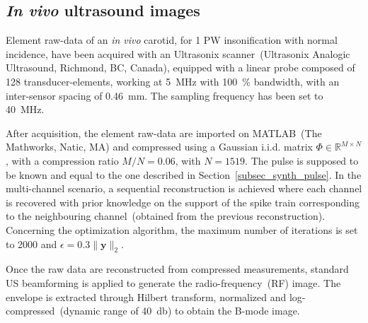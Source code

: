 \documentclass{article}
\newcommand{\vect}[1]{\bm{#1}}
\newcommand{\mat}[1]{\mathsf{#1}}
\theoremstyle{definition}
\begin{document}
\subsection{\textit{In vivo} ultrasound images}
\label{subsec_invivo_images}
Element raw-data of an \textit{in vivo} carotid, for 1 PW insonification with normal incidence, have been acquired with an Ultrasonix scanner~(Ultrasonix Analogic Ultrasound, Richmond, BC, Canada), equipped with a linear probe composed of \num{128} transducer-elements, working at \SI{5}{\mega\hertz} with \SI{100}{\percent} bandwidth, with an inter-sensor spacing of \SI{0.46}{\milli\metre}. The sampling frequency has been set to \SI{40}{\mega\hertz}. 

After acquisition, the element raw-data are imported on MATLAB~(The Mathworks, Natic, MA) and compressed using a Gaussian i.i.d. matrix $\mat{\Phi} \in \mathbb{R}^{M \times N}$, with a compression ratio $M/N = 0.06$, with $N=1519$. The pulse is supposed to be known and equal to the one described in Section~\ref{subsec_synth_pulse}. In the multi-channel scenario, a sequential reconstruction is achieved where each channel is recovered with prior knowledge on the support of the spike train corresponding to the neighbouring channel~(obtained from the previous reconstruction). Concerning the optimization algorithm, the maximum number of iterations is set to \num{2000} and $\epsilon = 0.3 \| \vect{y} \|_2$. 

Once the raw data are reconstructed from compressed measurements, standard US beamforming is applied to generate the radio-frequency~(RF) image. The envelope is extracted through Hilbert transform, normalized and log-compressed~(dynamic range of \SI{40}{\decibel}) to obtain the B-mode image. 
\end{document}
